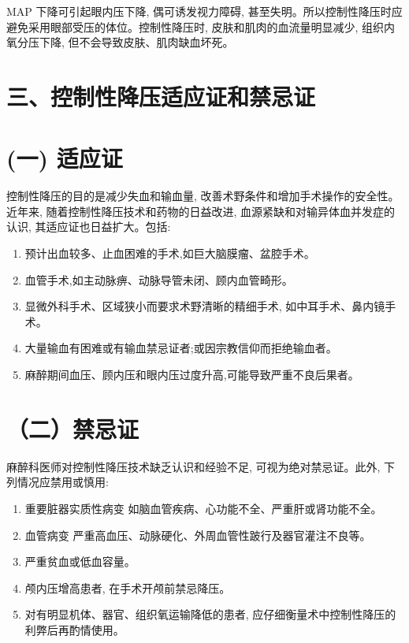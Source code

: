 \documentclass[10pt]{article}
\begin{document}
MAP 下降可引起眼内压下降, 偶可诱发视力障碍, 甚至失明。所以控制性降压时应避免采用眼部受压的体位。控制性降压时, 皮肤和肌肉的血流量明显减少, 组织内氧分压下降, 但不会导致皮肤、肌肉缺血坏死。

\section*{三、控制性降压适应证和禁忌证}
\section*{(一) 适应证}
控制性降压的目的是减少失血和输血量, 改善术野条件和增加手术操作的安全性。近年来, 随着控制性降压技术和药物的日益改进, 血源紧缺和对输异体血并发症的认识, 其适应证也日益扩大。包括:

\begin{enumerate}
  \item 预计出血较多、止血困难的手术,如巨大脑膜瘤、盆腔手术。

  \item 血管手术,如主动脉痹、动脉导管未闭、顾内血管畸形。

  \item 显微外科手术、区域狭小而要求术野清晰的精细手术, 如中耳手术、鼻内镜手术。

  \item 大量输血有困难或有输血禁忌证者;或因宗教信仰而拒绝输血者。

  \item 麻醉期间血压、顾内压和眼内压过度升高,可能导致严重不良后果者。

\end{enumerate}

\section*{（二）禁忌证}
麻醉科医师对控制性降压技术缺乏认识和经验不足, 可视为绝对禁忌证。此外, 下列情况应禁用或慎用:

\begin{enumerate}
  \item 重要脏器实质性病变 如脑血管疾病、心功能不全、严重肝或肾功能不全。

  \item 血管病变 严重高血压、动脉硬化、外周血管性跛行及器官灌注不良等。

  \item 严重贫血或低血容量。

  \item 颅内压增高患者, 在手术开颅前禁忌降压。

  \item 对有明显机体、器官、组织氧运输降低的患者, 应仔细衡量术中控制性降压的利弊后再酌情使用。

\end{enumerate}
\end{document}
